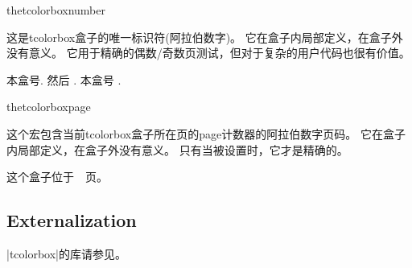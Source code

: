\begin{docCommand}[doc new=2015-11-13]{thetcolorboxnumber}{}
  
  这是tcolorbox盒子的唯一标识符(阿拉伯数字)。 %
  它在盒子内局部定义，在盒子外没有意义。%
  它用于精确的偶数/奇数页测试，但对于复杂的用户代码也很有价值。
  
  \begin{dispExample}
  \begin{tcolorbox}[colback=yellow!5,title=Box \thetcolorboxnumber]
  本盒号\thetcolorboxnumber.
     然后
    .
    本盒号 \thetcolorboxnumber.
  \end{tcolorbox}
  \end{dispExample}
  \end{docCommand}

  

\begin{docCommand}[doc new=2015-11-13]{thetcolorboxpage}{}
  
  这个宏包含当前tcolorbox盒子所在页的page计数器的阿拉伯数字页码。%
  它在盒子内局部定义，在盒子外没有意义。%
  只有当被设置时，它才是精确的。
  
  \begin{dispExample}
  \begin{tcolorbox}[colback=yellow!5,check odd page,
      title=Box on page~\thetcolorboxpage]
  这个盒子位于~\thetcolorboxpage~页。
  \end{tcolorbox}
  \end{dispExample}
  \end{docCommand}
  

\subsection{Externalization}
\begin{marker}
|tcolorbox|的库请参见。
\end{marker}

